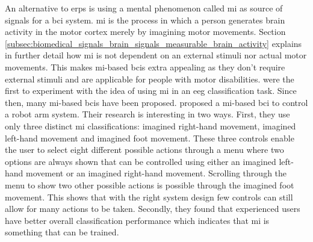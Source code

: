 An alternative to \glspl{erp} is using a mental phenomenon called \gls{mi} as source of signals for a \gls{bci} system.
\Gls{mi} is the process in which a person generates brain activity in the motor cortex merely by imagining motor movements.
Section \ref{subsec:biomedical_signals_brain_signals_measurable_brain_activity} explains in further detail how \gls{mi} is not dependent on an external stimuli nor actual motor movements.
This makes \gls{mi}-based \glspl{bci} extra appealing as they don't require external stimuli and are applicable for people with motor disabilities.
 were the first to experiment with the idea of using \gls{mi} in an \gls{eeg} classification task.
Since then, many \gls{mi}-based \glspl{bci} have been proposed.
 proposed a \gls{mi}-based \gls{bci} to control a robot arm system.
Their research is interesting in two ways.
First, they use only three distinct \gls{mi} classifications: imagined right-hand movement, imagined left-hand movement and imagined foot movement.
These three controls enable the user to select eight different possible actions through a menu where two options are always shown that can be controlled using either an imagined left-hand movement or an imagined right-hand movement.
Scrolling through the menu to show two other possible actions is possible through the imagined foot movement.
This shows that with the right system design few controls can still allow for many actions to be taken.
Secondly, they found that experienced users have better overall classification performance which indicates that \gls{mi} is something that can be trained.

